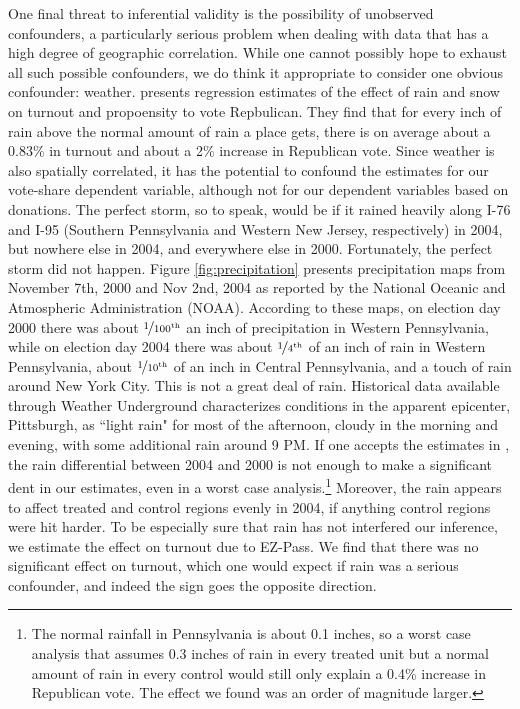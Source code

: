 One final threat to inferential validity is the possibility of unobserved confounders, a particularly serious problem when dealing with data that has a high degree of geographic correlation. While one cannot possibly hope to exhaust all such possible confounders, we do think it appropriate to consider one obvious confounder: weather. \textcite{Gomez2007} presents regression estimates of the effect of rain and snow on turnout and propoensity to vote Repbulican. They find that for every inch of rain above the normal amount of rain a place gets, there is on average about a 0.83\% in turnout and about a 2\% increase in Republican vote. Since weather is also spatially correlated, it has the potential to confound the estimates for our vote-share dependent variable, although not for our dependent variables based on donations. The perfect storm, so to speak, would be if it rained heavily along I-76 and I-95 (Southern Pennsylvania and Western New Jersey, respectively) in 2004, but nowhere else in 2004, and everywhere else in 2000. Fortunately, the perfect storm did not happen.  Figure \ref{fig:precipitation} presents precipitation maps from November 7th, 2000 and Nov 2nd, 2004 as reported by the National Oceanic and Atmospheric Administration (NOAA). According to these maps, on election day 2000 there was about $\nicefrac{1}{100^{\mathrm{th}}}$ an inch of precipitation in Western Pennsylvania, while on election day 2004 there was about $\nicefrac{1}{4^{\mathrm{th}}}$ of an inch of rain in Western Pennsylvania, about $\nicefrac{1}{10^{\mathrm{th}}}$ of an inch in Central Pennsylvania, and a touch of rain around New York City. This is not a great deal of rain. Historical data available through Weather Underground characterizes conditions in the apparent epicenter, Pittsburgh, as ``light rain" for most of the afternoon, cloudy in the morning and evening, with some additional rain around 9 PM. If one accepts the estimates in \textcite{Gomez2007}, the rain differential between 2004 and 2000 is not enough to make a significant dent in our estimates, even in a worst case analysis.\footnote{The normal rainfall in Pennsylvania is about 0.1 inches, so a worst case analysis that assumes 0.3 inches of rain in every treated unit but a normal amount of rain in every control would still only explain a 0.4\% increase in Republican vote. The effect we found was an order of magnitude larger. }  Moreover, the rain appears to affect treated and control regions evenly in 2004, if anything control regions were hit harder. To be especially sure that rain has not interfered our inference, we estimate the effect on turnout due to EZ-Pass.  We find that there was no significant effect on turnout, which one would expect if rain was a serious confounder, and indeed the sign goes the opposite direction.

